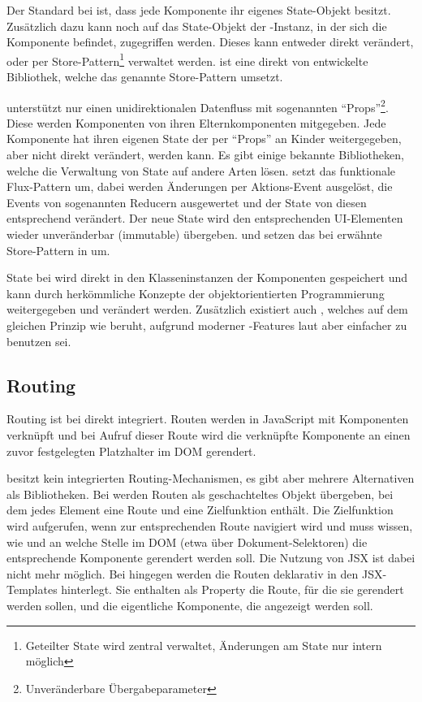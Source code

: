 Der Standard bei  ist, dass jede Komponente ihr eigenes State-Objekt besitzt. Zusätzlich dazu kann noch auf das State-Objekt der -Instanz, in der sich die Komponente befindet, zugegriffen werden. Dieses kann entweder direkt verändert, oder per Store-Pattern\footnote{Geteilter State wird zentral verwaltet, Änderungen am State nur intern möglich} verwaltet werden.  ist eine direkt von  entwickelte Bibliothek, welche das genannte Store-Pattern umsetzt.

 unterstützt nur einen unidirektionalen Datenfluss mit sogenannten ``Props''\footnote{Unveränderbare Übergabeparameter}. Diese werden Komponenten von ihren Elternkomponenten mitgegeben. Jede Komponente hat ihren eigenen State der per ``Props'' an Kinder weitergegeben, aber nicht direkt verändert, werden kann. Es gibt einige bekannte Bibliotheken, welche die Verwaltung von State auf andere Arten lösen.  setzt das funktionale Flux-Pattern um, dabei werden Änderungen per Aktions-Event ausgelöst, die Events von sogenannten Reducern ausgewertet und der State von diesen entsprechend verändert. Der neue State wird den entsprechenden UI-Elementen wieder unveränderbar (immutable) übergeben.  und  setzen das bei  erwähnte Store-Pattern in  um.

State bei  wird direkt in den Klasseninstanzen der Komponenten gespeichert und kann durch herkömmliche Konzepte der objektorientierten Programmierung weitergegeben und verändert werden. Zusätzlich existiert auch , welches auf dem gleichen Prinzip wie  beruht, aufgrund moderner -Features laut  aber einfacher zu benutzen sei.

\subsection{Routing}
Routing ist bei  direkt integriert. Routen werden in JavaScript mit Komponenten verknüpft und bei Aufruf dieser Route wird die verknüpfte Komponente an einen zuvor festgelegten Platzhalter im DOM gerendert.

 besitzt kein integrierten Routing-Mechanismen, es gibt aber mehrere Alternativen als Bibliotheken. Bei  werden Routen als geschachteltes Objekt übergeben, bei dem jedes Element eine Route und eine Zielfunktion enthält. Die Zielfunktion wird aufgerufen, wenn zur entsprechenden Route navigiert wird und muss wissen, wie und an welche Stelle im DOM (etwa über Dokument-Selektoren) die entsprechende Komponente gerendert werden soll. Die Nutzung von JSX ist dabei nicht mehr möglich. Bei  hingegen werden die Routen deklarativ in den JSX-Templates hinterlegt. Sie enthalten als Property die Route, für die sie gerendert werden sollen, und die eigentliche Komponente, die angezeigt werden soll.

